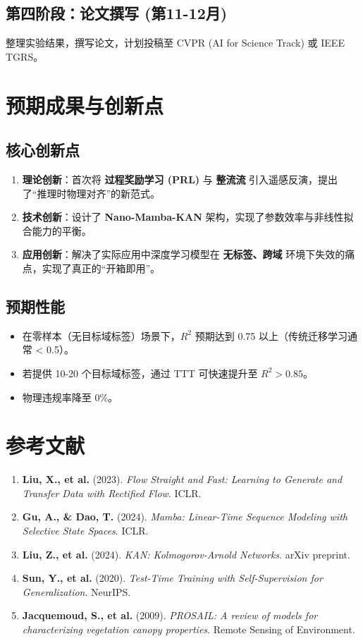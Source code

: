 \documentclass[12pt, a4paper]{article}
\begin{document}
\subsection{第四阶段：论文撰写 (第11-12月)}
整理实验结果，撰写论文，计划投稿至 CVPR (AI for Science Track) 或 IEEE TGRS。

\section{预期成果与创新点}

\subsection{核心创新点}
\begin{enumerate}
    \item \textbf{理论创新}：首次将 \textbf{过程奖励学习 (PRL)} 与 \textbf{整流流} 引入遥感反演，提出了“推理时物理对齐”的新范式。
    \item \textbf{技术创新}：设计了 \textbf{Nano-Mamba-KAN} 架构，实现了参数效率与非线性拟合能力的平衡。
    \item \textbf{应用创新}：解决了实际应用中深度学习模型在 \textbf{无标签、跨域} 环境下失效的痛点，实现了真正的“开箱即用”。
\end{enumerate}

\subsection{预期性能}
\begin{itemize}
    \item 在零样本（无目标域标签）场景下，$R^2$ 预期达到 0.75 以上（传统迁移学习通常 < 0.5）。
    \item 若提供 10-20 个目标域标签，通过 TTT 可快速提升至 $R^2 > 0.85$。
    \item 物理违规率降至 0\%。
\end{itemize}

\newpage
\section{参考文献}

\begin{enumerate}
    \item \textbf{Liu, X., et al.} (2023). \textit{Flow Straight and Fast: Learning to Generate and Transfer Data with Rectified Flow}. ICLR.
    \item \textbf{Gu, A., \& Dao, T.} (2024). \textit{Mamba: Linear-Time Sequence Modeling with Selective State Spaces}. ICLR.
    \item \textbf{Liu, Z., et al.} (2024). \textit{KAN: Kolmogorov-Arnold Networks}. arXiv preprint.
    \item \textbf{Sun, Y., et al.} (2020). \textit{Test-Time Training with Self-Supervision for Generalization}. NeurIPS.
    \item \textbf{Jacquemoud, S., et al.} (2009). \textit{PROSAIL: A review of models for characterizing vegetation canopy properties}. Remote Sensing of Environment.
\end{enumerate}
\end{document}
